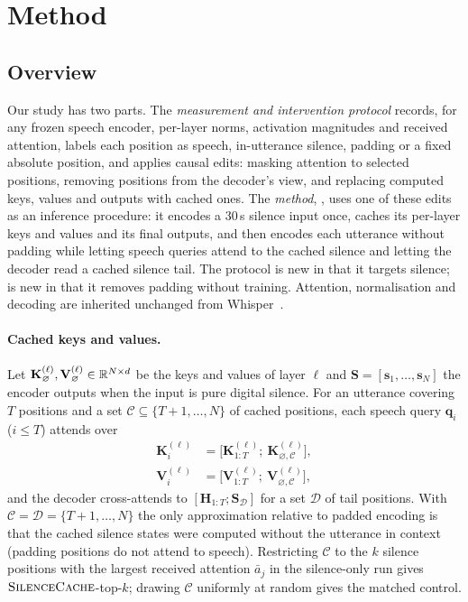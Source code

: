 \section{Method}
\label{sec:method}

\subsection{Overview}

Our study has two parts. The \emph{measurement and intervention protocol} records, for any frozen speech encoder, per-layer norms, activation magnitudes and received attention, labels each position as speech, in-utterance silence, padding or a fixed absolute position, and applies causal edits: masking attention to selected positions, removing positions from the decoder's view, and replacing computed keys, values and outputs with cached ones. The \emph{method}, \method{}, uses one of these edits as an inference procedure: it encodes a 30\,s silence input once, caches its per-layer keys and values and its final outputs, and then encodes each utterance without padding while letting speech queries attend to the cached silence and letting the decoder read a cached silence tail. The protocol is new in that it targets silence; \method{} is new in that it removes padding without training. Attention, normalisation and decoding are inherited unchanged from Whisper~\cite{radford2023whisper}.

\paragraph{Cached keys and values.} Let $\mathbf{K}^{(\ell)}_{\varnothing},\mathbf{V}^{(\ell)}_{\varnothing}\in\mathbb{R}^{N\times d}$ be the keys and values of layer $\ell$ and $\mathbf{S}=[\mathbf{s}_1,\dots,\mathbf{s}_N]$ the encoder outputs when the input is pure digital silence. For an utterance covering $T$ positions and a set $\mathcal{C}\subseteq\{T{+}1,\dots,N\}$ of cached positions, each speech query $\mathbf{q}_i$ ($i\le T$) attends over
\begin{align}
    \mathbf{K}_i^{(\ell)} &= \big[\mathbf{K}^{(\ell)}_{1:T};\ \mathbf{K}^{(\ell)}_{\varnothing,\mathcal{C}}\big], \\
    \mathbf{V}_i^{(\ell)} &= \big[\mathbf{V}^{(\ell)}_{1:T};\ \mathbf{V}^{(\ell)}_{\varnothing,\mathcal{C}}\big],
    \label{eq:update}
\end{align}
and the decoder cross-attends to $[\mathbf{H}_{1:T};\mathbf{S}_{\mathcal{D}}]$ for a set $\mathcal{D}$ of tail positions. With $\mathcal{C}=\mathcal{D}=\{T{+}1,\dots,N\}$ the only approximation relative to padded encoding is that the cached silence states were computed without the utterance in context (padding positions do not attend to speech). Restricting $\mathcal{C}$ to the $k$ silence positions with the largest received attention $\bar a_j$ in the silence-only run gives $\textsc{SilenceCache}{}$-top-$k$; drawing $\mathcal{C}$ uniformly at random gives the matched control.

